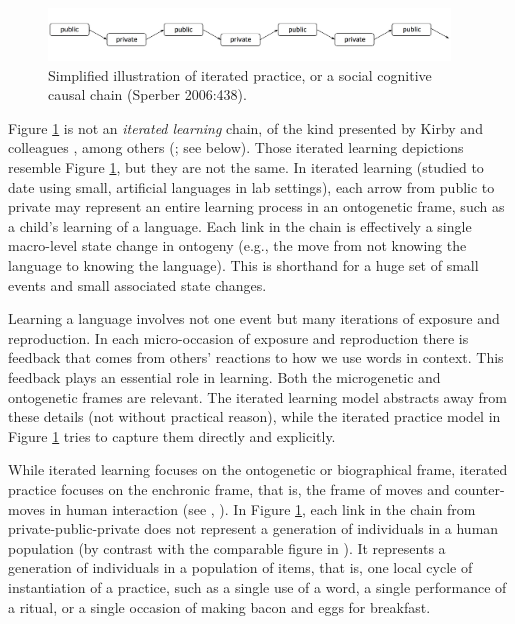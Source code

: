 \begin{figure}[h]
\includegraphics[width=0.95\textwidth,keepaspectratio]{figures/ch02fig01}
\caption{Simplified illustration of iterated practice, or a social 
cognitive causal chain (Sperber 2006:438).}
\label{iteratedpractice}
\end{figure}



Figure \ref{iteratedpractice} is not an \textit{iterated learning} chain, of the kind presented by 
Kirby and colleagues \citep{kirby_ug_2004,kirby_cumulative_2008}, among 
others (\citealt{christiansen_language_2008}; see below). Those iterated learning depictions resemble Figure \ref{iteratedpractice}, 
but they are not the same. In iterated learning (studied to date using small, artificial languages in lab settings), each arrow from public 
to private may represent an entire learning process in an ontogenetic frame, such as a child's 
learning of a language. Each link in the chain is effectively a single 
macro-level state change in ontogeny (e.g., the move from not knowing 
the language to knowing the language). This is shorthand for a huge set 
of small events and small associated state changes. 



Learning a language involves not one event but many iterations of 
exposure and reproduction. In each micro-occasion of exposure and 
reproduction there is feedback that comes from others' reactions to how we use words in context. This feedback plays 
an essential role in learning. Both the microgenetic and ontogenetic frames are relevant. The iterated learning model abstracts 
away from these details (not without practical reason), while the 
iterated practice model in Figure \ref{iteratedpractice} tries to capture them directly and 
explicitly. 



While iterated learning focuses on the ontogenetic or biographical 
frame, iterated practice focuses on the enchronic 
frame, that is, the frame of moves and counter-moves in 
human interaction (see \citealt[10]{enfield_anatomy_2009}, \citeyear[Chapter 4]{enfield_relationship_2013}). In Figure \ref{iteratedpractice}, each link in the chain from 
private-public-private does not represent a generation of individuals in 
a human population (by contrast with the comparable figure in 
\citealt{christiansen_language_2008}). It represents a generation of individuals 
in a population of items, that is, one local cycle of 
instantiation of a practice, such as a single use of a word, a single 
performance of a ritual, or a single occasion of making bacon and eggs 
for breakfast. 



